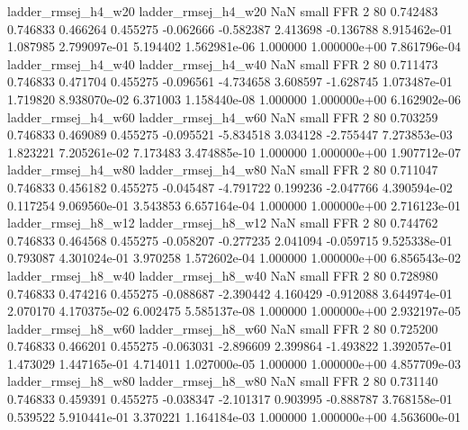      ladder_rmsej_h4_w20      ladder_rmsej_h4_w20                   NaN      small      FFR                 2 80 0.742483       0.746833 0.466264       0.455275   -0.062666     -0.582387      2.413698    -0.136788   8.915462e-01  1.087985 2.799097e-01     5.194402   1.562981e-06            1.000000    1.000000e+00        7.861796e-04
     ladder_rmsej_h4_w40      ladder_rmsej_h4_w40                   NaN      small      FFR                 2 80 0.711473       0.746833 0.471704       0.455275   -0.096561     -4.734658      3.608597    -1.628745   1.073487e-01  1.719820 8.938070e-02     6.371003   1.158440e-08            1.000000    1.000000e+00        6.162902e-06
     ladder_rmsej_h4_w60      ladder_rmsej_h4_w60                   NaN      small      FFR                 2 80 0.703259       0.746833 0.469089       0.455275   -0.095521     -5.834518      3.034128    -2.755447   7.273853e-03  1.823221 7.205261e-02     7.173483   3.474885e-10            1.000000    1.000000e+00        1.907712e-07
     ladder_rmsej_h4_w80      ladder_rmsej_h4_w80                   NaN      small      FFR                 2 80 0.711047       0.746833 0.456182       0.455275   -0.045487     -4.791722      0.199236    -2.047766   4.390594e-02  0.117254 9.069560e-01     3.543853   6.657164e-04            1.000000    1.000000e+00        2.716123e-01
     ladder_rmsej_h8_w12      ladder_rmsej_h8_w12                   NaN      small      FFR                 2 80 0.744762       0.746833 0.464568       0.455275   -0.058207     -0.277235      2.041094    -0.059715   9.525338e-01  0.793087 4.301024e-01     3.970258   1.572602e-04            1.000000    1.000000e+00        6.856543e-02
     ladder_rmsej_h8_w40      ladder_rmsej_h8_w40                   NaN      small      FFR                 2 80 0.728980       0.746833 0.474216       0.455275   -0.088687     -2.390442      4.160429    -0.912088   3.644974e-01  2.070170 4.170375e-02     6.002475   5.585137e-08            1.000000    1.000000e+00        2.932197e-05
     ladder_rmsej_h8_w60      ladder_rmsej_h8_w60                   NaN      small      FFR                 2 80 0.725200       0.746833 0.466201       0.455275   -0.063031     -2.896609      2.399864    -1.493822   1.392057e-01  1.473029 1.447165e-01     4.714011   1.027000e-05            1.000000    1.000000e+00        4.857709e-03
     ladder_rmsej_h8_w80      ladder_rmsej_h8_w80                   NaN      small      FFR                 2 80 0.731140       0.746833 0.459391       0.455275   -0.038347     -2.101317      0.903995    -0.888787   3.768158e-01  0.539522 5.910441e-01     3.370221   1.164184e-03            1.000000    1.000000e+00        4.563600e-01
